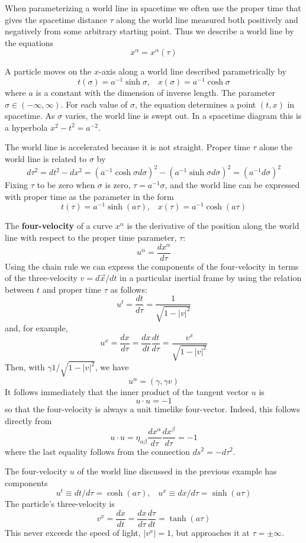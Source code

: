 When parameterizing a world line in spacetime we often use the proper time that gives the spacetime distance $\tau$ along the world line measured both positively and negatively from some arbitrary starting point. Thus we describe a world line by the equations $$x^{\alpha} = x^{\alpha}(\tau)$$
\begin{eg}
    A particle moves on the $x$-axis along a world line described parametrically by $$t(\sigma) = a^{-1}\sinh\sigma,\;\;\;x(\sigma) = a^{-1}\cosh\sigma$$
    where $a$ is a constant with the dimension of inverse length. The parameter $\sigma \in (-\infty,\infty)$. For each value of $\sigma$, the equation determines a point $(t,x)$ in spacetime. As $\sigma$ varies, the world line is swept out. In a spacetime diagram this is a hyperbola $x^2-t^2 = a^{-2}$.

    The world line is accelerated because it is not straight. Proper time $\tau$ alone the world line is related to $\sigma$ by $$d\tau^2 = dt^2-dx^2 = (a^{-1}\cosh\sigma d\sigma)^2 - (a^{-1}\sinh\sigma d\sigma)^2 = (a^{-1}d\sigma)^2$$
    Fixing $\tau$ to be zero when $\sigma$ is zero, $\tau = a^{-1}\sigma$, and the world line can be expressed with proper time as the parameter in the form $$t(\tau) = a^{-1}\sinh(a\tau),\;\;\;x(\tau) = a^{-1}\cosh(a\tau)$$
\end{eg}

The \textbf{four-velocity} of a curve $x^{\alpha}$ is the derivative of the position along the world line with respect to the proper time parameter, $\tau$: $$\boxed{u^{\alpha} = \frac{dx^{\alpha}}{d\tau}}$$
Using the chain rule we can express the components of the four-velocity in terms of the three-velocity $v = d\vec{x}/dt$ in a particular inertial frame by using the relation between $t$ and proper time $\tau$ as follows: $$u^t = \frac{dt}{d\tau} = \frac{1}{\sqrt{1-|v|^2}}$$
and, for example, $$u^x = \frac{dx}{d\tau} = \frac{dx}{dt}\frac{dt}{d\tau} = \frac{v^x}{\sqrt{1-|v|^2}}$$
Then, with $\gamma 1/\sqrt{1-|v|^2}$, we have $$u^{\alpha} = (\gamma,\gamma v)$$
It follows immediately that the inner product of the tangent vector $u$ is $$u\cdot u = -1$$
so that the four-velocity is always a unit timelike four-vector. Indeed, this follows directly from $$u\cdot u = \eta_{\alpha\beta}\frac{dx^{\alpha}}{d\tau}\frac{dx^{\beta}}{d\tau} = -1$$
where the last equality follows from the connection $ds^2 = -d\tau^2$.

\begin{eg}
    The four-velocity $u$ of the world line discussed in the previous example has components \begin{equation*}
        u^t \equiv dt/d\tau = \cosh(a\tau),\;\;\;u^x \equiv dx/d\tau = \sinh(a\tau)
    \end{equation*}
    The particle's three-velocity is $$v^x = \frac{dx}{dt} = \frac{dx}{d\tau}\frac{d\tau}{dt} = \tanh(a\tau)$$
    This never exceeds the speed of light, $|v^x| = 1$, but approaches it at $\tau = \pm \infty$.
\end{eg}





